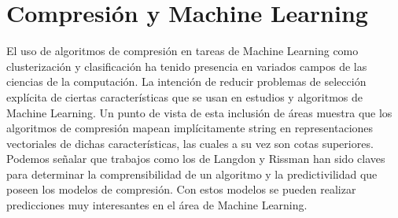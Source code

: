 
\chapter[Compresión y Machine Learning]{Compresión y Machine Learning}
\label{ch:Compresion-Machine-Learning}








El uso de algoritmos de compresión en tareas de Machine Learning como clusterización y clasificación ha tenido presencia en variados campos de las ciencias de la computación. La intención de reducir problemas de selección explícita de ciertas características que se usan en estudios y algoritmos de Machine Learning.
Un punto de vista de esta inclusión de áreas muestra que los algoritmos de compresión mapean implícitamente string en representaciones vectoriales de dichas características, las cuales a su vez son cotas superiores. Podemos señalar que  trabajos como los de Langdon y Rissman han sido claves para determinar la comprensibilidad de un algoritmo y la predictivilidad que poseen los modelos de compresión. 
Con estos modelos
se pueden realizar predicciones muy interesantes en el área de Machine Learning.









